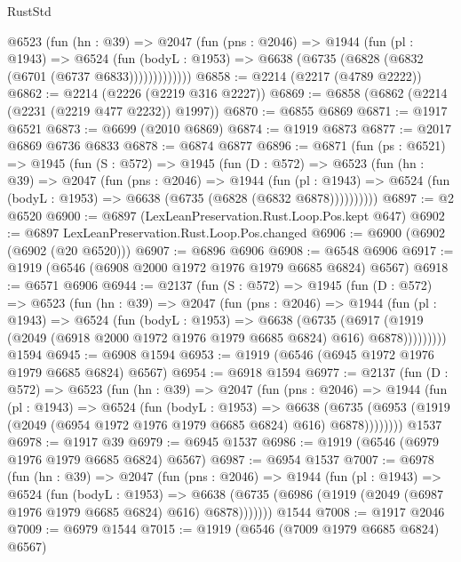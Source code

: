 \begin{lexlean}{RustStd}
\begin{coremodule}
          @6523
            (fun (hn : @39) =>
            @2047
              (fun (pns : @2046) =>
              @1944
                (fun (pl : @1943) =>
                @6524
                  (fun (bodyL : @1953) =>
                  @6638 (@6735 (@6828 (@6832 (@6701 (@6737 @6833)))))))))))))
@6858 := @2214 (@2217 (@4789 @2222))
@6862 := @2214 (@2226 (@2219 @316 @2227))
@6869 := @6858 (@6862 (@2214 (@2231 (@2219 @477 @2232)) @1997))
@6870 := @6855 @6869
@6871 := @1917 @6521
@6873 := @6699 (@2010 @6869)
@6874 := @1919 @6873
@6877 := @2017 @6869 @6736 @6833
@6878 := @6874 @6877
@6896 := @6871
    (fun (ps : @6521) =>
    @1945
      (fun (S : @572) =>
      @1945
        (fun (D : @572) =>
        @6523
          (fun (hn : @39) =>
          @2047
            (fun (pns : @2046) =>
            @1944
              (fun (pl : @1943) =>
              @6524 (fun (bodyL : @1953) => @6638 (@6735 (@6828 (@6832 @6878))))))))))
@6897 := @2 @6520
@6900 := @6897 (LexLeanPreservation.Rust.Loop.Pos.kept @647)
@6902 := @6897 LexLeanPreservation.Rust.Loop.Pos.changed
@6906 := @6900 (@6902 (@6902 (@20 @6520)))
@6907 := @6896 @6906
@6908 := @6548 @6906
@6917 := @1919 (@6546 (@6908 @2000 @1972 @1976 @1979 @6685 @6824) @6567)
@6918 := @6571 @6906
@6944 := @2137
    (fun (S : @572) =>
    @1945
      (fun (D : @572) =>
      @6523
        (fun (hn : @39) =>
        @2047
          (fun (pns : @2046) =>
          @1944
            (fun (pl : @1943) =>
            @6524
              (fun (bodyL : @1953) =>
              @6638
                (@6735
                  (@6917
                    (@1919 (@2049 (@6918 @2000 @1972 @1976 @1979 @6685 @6824) @616) @6878)))))))))
    @1594
@6945 := @6908 @1594
@6953 := @1919 (@6546 (@6945 @1972 @1976 @1979 @6685 @6824) @6567)
@6954 := @6918 @1594
@6977 := @2137
    (fun (D : @572) =>
    @6523
      (fun (hn : @39) =>
      @2047
        (fun (pns : @2046) =>
        @1944
          (fun (pl : @1943) =>
          @6524
            (fun (bodyL : @1953) =>
            @6638
              (@6735 (@6953 (@1919 (@2049 (@6954 @1972 @1976 @1979 @6685 @6824) @616) @6878))))))))
    @1537
@6978 := @1917 @39
@6979 := @6945 @1537
@6986 := @1919 (@6546 (@6979 @1976 @1979 @6685 @6824) @6567)
@6987 := @6954 @1537
@7007 := @6978
    (fun (hn : @39) =>
    @2047
      (fun (pns : @2046) =>
      @1944
        (fun (pl : @1943) =>
        @6524
          (fun (bodyL : @1953) =>
          @6638 (@6735 (@6986 (@1919 (@2049 (@6987 @1976 @1979 @6685 @6824) @616) @6878)))))))
    @1544
@7008 := @1917 @2046
@7009 := @6979 @1544
@7015 := @1919 (@6546 (@7009 @1979 @6685 @6824) @6567)

\end{coremodule}
\end{lexlean}
